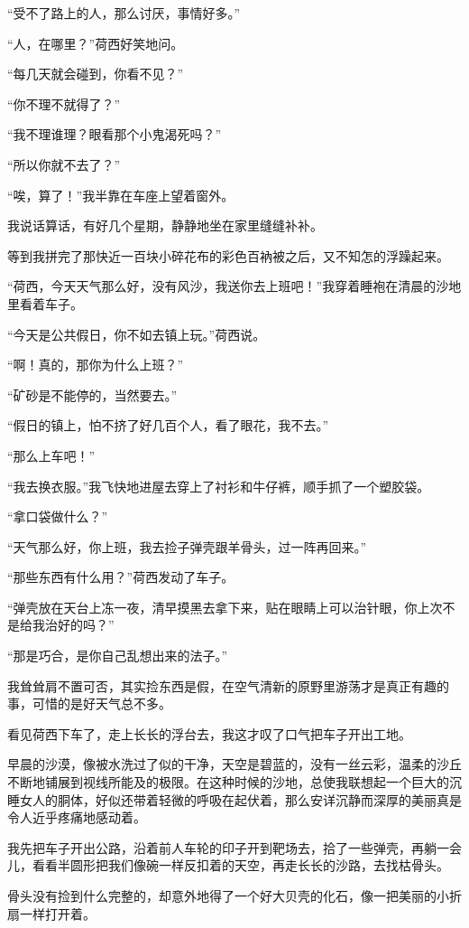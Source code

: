 \par “受不了路上的人，那么讨厌，事情好多。”
\par “人，在哪里？”荷西好笑地问。
\par “每几天就会碰到，你看不见？”
\par “你不理不就得了？”
\par “我不理谁理？眼看那个小鬼渴死吗？”
\par “所以你就不去了？”
\par “唉，算了！”我半靠在车座上望着窗外。
\par 我说话算话，有好几个星期，静静地坐在家里缝缝补补。
\par 等到我拼完了那快近一百块小碎花布的彩色百衲被之后，又不知怎的浮躁起来。
\par “荷西，今天天气那么好，没有风沙，我送你去上班吧！”我穿着睡袍在清晨的沙地里看着车子。
\par “今天是公共假日，你不如去镇上玩。”荷西说。
\par “啊！真的，那你为什么上班？”
\par “矿砂是不能停的，当然要去。”
\par “假日的镇上，怕不挤了好几百个人，看了眼花，我不去。”
\par “那么上车吧！”
\par “我去换衣服。”我飞快地进屋去穿上了衬衫和牛仔裤，顺手抓了一个塑胶袋。
\par “拿口袋做什么？”
\par “天气那么好，你上班，我去捡子弹壳跟羊骨头，过一阵再回来。”
\par “那些东西有什么用？”荷西发动了车子。
\par “弹壳放在天台上冻一夜，清早摸黑去拿下来，贴在眼睛上可以治针眼，你上次不是给我治好的吗？”
\par “那是巧合，是你自己乱想出来的法子。”
\par 我耸耸肩不置可否，其实捡东西是假，在空气清新的原野里游荡才是真正有趣的事，可惜的是好天气总不多。
\par 看见荷西下车了，走上长长的浮台去，我这才叹了口气把车子开出工地。
\par 早晨的沙漠，像被水洗过了似的干净，天空是碧蓝的，没有一丝云彩，温柔的沙丘不断地铺展到视线所能及的极限。在这种时候的沙地，总使我联想起一个巨大的沉睡女人的胴体，好似还带着轻微的呼吸在起伏着，那么安详沉静而深厚的美丽真是令人近乎疼痛地感动着。
\par 我先把车子开出公路，沿着前人车轮的印子开到靶场去，拾了一些弹壳，再躺一会儿，看看半圆形把我们像碗一样反扣着的天空，再走长长的沙路，去找枯骨头。
\par 骨头没有捡到什么完整的，却意外地得了一个好大贝壳的化石，像一把美丽的小折扇一样打开着。

